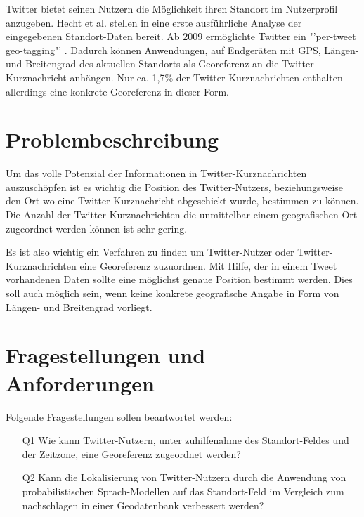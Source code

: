  		
 		Twitter bietet seinen Nutzern die Möglichkeit ihren Standort im Nutzerprofil anzugeben. 
 		Hecht et al. stellen in \cite{Hecht2011} eine erste ausführliche Analyse der eingegebenen Standort-Daten bereit.  
 		Ab 2009 ermöglichte Twitter ein "'per-tweet geo-tagging"' \cite{Cheng2010}.
 		Dadurch können Anwendungen, auf Endgeräten mit GPS, Längen- und Breitengrad des aktuellen Standorts als Georeferenz an die Twitter-Kurznachricht anhängen.    
		Nur ca. 1,7\% der Twitter-Kurznachrichten enthalten allerdings eine konkrete Georeferenz in dieser Form.


	\section{Problembeschreibung} 
		Um das volle Potenzial der Informationen in Twitter-Kurznachrichten auszuschöpfen ist es wichtig die Position des Twitter-Nutzers, beziehungsweise den Ort wo eine Twitter-Kurznachricht abgeschickt wurde, bestimmen zu können. 
		Die Anzahl der Twitter-Kurznachrichten die unmittelbar einem geografischen Ort zugeordnet werden können ist sehr gering. 
		
		Es ist also wichtig ein Verfahren zu finden um Twitter-Nutzer oder Twitter-Kurznachrichten eine Georeferenz zuzuordnen. 
		Mit Hilfe, der in einem Tweet vorhandenen Daten sollte eine möglichst genaue Position bestimmt werden. 
		Dies soll auch möglich sein, wenn keine konkrete geografische Angabe in Form von Längen- und Breitengrad vorliegt. 

	\section{Fragestellungen und Anforderungen}\label{sec:fragestellung}
		Folgende Fragestellungen sollen beantwortet werden: 
		\begin{enumerate}
			\item[Q1] Wie kann Twitter-Nutzern, unter zuhilfenahme des Standort-Feldes und der Zeitzone, eine Georeferenz zugeordnet werden?
			\item[Q2] Kann die Lokalisierung von Twitter-Nutzern durch die Anwendung von probabilistischen Sprach-Modellen auf das Standort-Feld im Vergleich zum nachschlagen in einer Geodatenbank verbessert werden? 
		\end{enumerate}
		  

